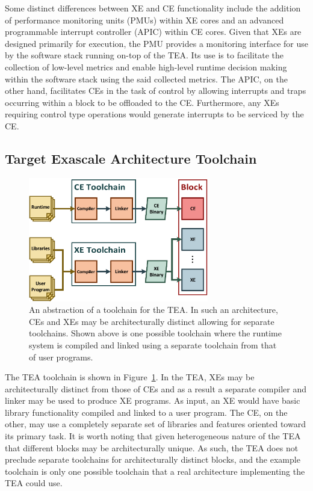        Some distinct differences between XE and CE functionality include the addition of performance monitoring units (PMUs) within XE cores and an advanced programmable interrupt controller (APIC) within CE cores. Given that XEs are designed primarily for execution, the PMU provides a monitoring interface for use by the software stack running on-top of the TEA. Its use is to facilitate the collection of low-level metrics and enable high-level runtime decision making within the software stack using the said collected metrics. The APIC, on the other hand, facilitates CEs in the task of control by allowing interrupts and traps occurring within a block to be offloaded to the CE. Furthermore, any XEs requiring control type operations would generate interrupts to be serviced by the CE.

    \subsection{Target Exascale Architecture Toolchain}
        \begin{figure}[htb!]
            \centering
            \includegraphics[width=0.7\textwidth]{Fig/TEA_toolchain.pdf}
            \caption[Target Exascale Architecture Toolchain]{An abstraction of a toolchain for the TEA. In such an architecture, CEs and XEs may be architecturally distinct allowing for separate toolchains. Shown above is one possible toolchain where the runtime system is compiled and linked using a separate toolchain from that of user programs.}
            \label{fig:TEA-toolchain}
        \end{figure}

        The TEA toolchain is shown in Figure~\ref{fig:TEA-toolchain}. In the TEA, XEs may be architecturally distinct from those of CEs and as a result a separate compiler and linker may be used to produce XE programs. As input, an XE would have basic library functionality compiled and linked to a user program. The CE, on the other, may use a completely separate set of libraries and features oriented toward its primary task. It is worth noting that given heterogeneous nature of the TEA that different blocks may be architecturally unique. As such, the TEA does not preclude separate toolchains for architecturally distinct blocks, and the example toolchain is only one possible toolchain that a real architecture implementing the TEA could use.

